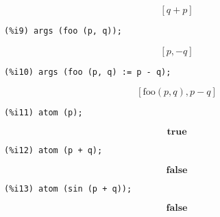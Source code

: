 \documentclass[12pt,leqno]{article}
\begin{document}
\begin{enumerate}
\begin{equation}
\left[ q+p \right] \tag{\%o8}
\label{eq:doc-group1-code10-8-1}
\end{equation}
\begin{verbatim}
(%i9) args (foo (p, q));
\end{verbatim}
\begin{equation}
\left[ p , -q \right] \tag{\%o9}
\label{eq:doc-group1-code10-9-1}
\end{equation}
\begin{verbatim}
(%i10) args (foo (p, q) := p - q);
\end{verbatim}
\begin{equation}
\left[ \mathrm{foo}\left(p , q\right) , p-q \right] \tag{\%o10}
\label{eq:doc-group1-code10-10-1}
\end{equation}
\begin{verbatim}
(%i11) atom (p);
\end{verbatim}
\begin{equation}
\mathbf{true}\tag{\%o11}
\label{eq:doc-group1-code10-11-1}
\end{equation}
\begin{verbatim}
(%i12) atom (p + q);
\end{verbatim}
\begin{equation}
\mathbf{false}\tag{\%o12}
\label{eq:doc-group1-code10-12-1}
\end{equation}
\begin{verbatim}
(%i13) atom (sin (p + q));
\end{verbatim}
\begin{equation}
\mathbf{false}\tag{\%o13}
\label{eq:doc-group1-code10-13-1}
\end{equation}



\end{enumerate}
\end{document}

